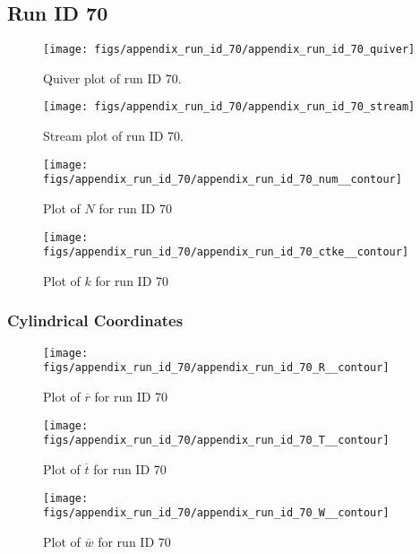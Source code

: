 \subsection{Run ID 70}
\begin{figure}[H]
\centering
\texttt{[image: figs/appendix\_run\_id\_70/appendix\_run\_id\_70\_quiver]}
\caption{Quiver plot of run ID 70.}
\label{fig:appendix_run_id_70_quiver}
\end{figure}


\begin{figure}[H]
\centering
\texttt{[image: figs/appendix\_run\_id\_70/appendix\_run\_id\_70\_stream]}
\caption{Stream plot of run ID 70.}
\label{fig:appendix_run_id_70_stream}
\end{figure}


\begin{figure}[H]
\centering
\texttt{[image: figs/appendix\_run\_id\_70/appendix\_run\_id\_70\_num\_\_contour]}
\caption{Plot of $N$ for run ID 70}
\label{fig:appendix_run_id_70_num__contour}
\end{figure}


\begin{figure}[H]
\centering
\texttt{[image: figs/appendix\_run\_id\_70/appendix\_run\_id\_70\_ctke\_\_contour]}
\caption{Plot of $k$ for run ID 70}
\label{fig:appendix_run_id_70_ctke__contour}
\end{figure}


\subsubsection{Cylindrical Coordinates}
\begin{figure}[H]
\centering
\texttt{[image: figs/appendix\_run\_id\_70/appendix\_run\_id\_70\_R\_\_contour]}
\caption{Plot of $\overline{r}$ for run ID 70}
\label{fig:appendix_run_id_70_R__contour}
\end{figure}


\begin{figure}[H]
\centering
\texttt{[image: figs/appendix\_run\_id\_70/appendix\_run\_id\_70\_T\_\_contour]}
\caption{Plot of $\overline{t}$ for run ID 70}
\label{fig:appendix_run_id_70_T__contour}
\end{figure}


\begin{figure}[H]
\centering
\texttt{[image: figs/appendix\_run\_id\_70/appendix\_run\_id\_70\_W\_\_contour]}
\caption{Plot of $\overline{w}$ for run ID 70}
\label{fig:appendix_run_id_70_W__contour}
\end{figure}



